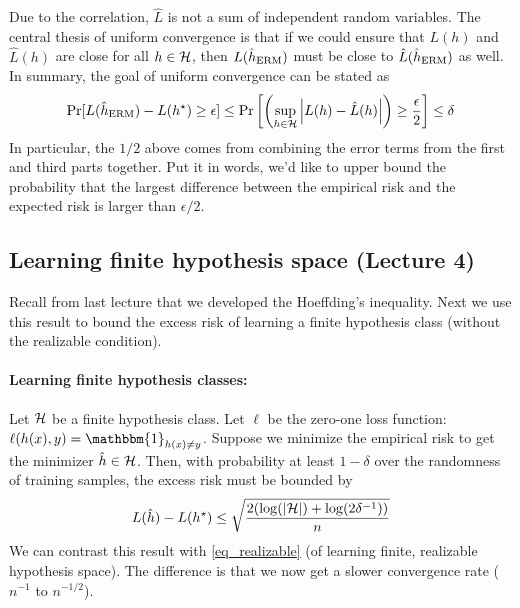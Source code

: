 Due to the correlation, $\hat L$ is not a sum of independent random variables.
The central thesis of uniform convergence is that if we could ensure that $L(h)$ and $\hat L(h)$ are close for all $h\in\mathcal{H}$, then $L(\hat h_{\textup{ERM}})$ must be close to $\hat L(\hat h_{\textup{ERM}})$ as well.
In summary, the goal of uniform convergence can be stated as
\begin{align}
    \Pr[L(\hat h_{\textup{ERM}}) - L(h^{\star}) \ge \epsilon]
    \le \Pr\left[ \left(\sup_{h \in \mathcal{H}} \left\lvert L(h) - \hat L(h)\right\rvert \right) \ge \frac {\epsilon} 2 \right]
    \le \delta
\end{align}
In particular, the $1/2$ above comes from combining the error terms from the first and third parts together.
Put it in words, we'd like to upper bound the probability that the largest difference between the empirical risk and the expected risk is larger than $\epsilon /2$.



\iffalse
\subsection{Learning finite hypothesis space (Lecture 4)}

Recall from last lecture that we developed the Hoeffding's inequality.
Next we use this result to bound the excess risk of learning a finite hypothesis class (without the realizable condition).

\paragraph{Learning finite hypothesis classes:}
Let $\mathcal{H}$ be a finite hypothesis class. Let $\ell$ be the zero-one loss function: $\ell(h(x), y) = \mathbbm{1}_{h(x) \neq y}$.
Suppose we minimize the empirical risk to get the minimizer $\hat h\in\mathcal{H}$.
Then, with probability at least $1 - \delta$ over the randomness of training samples, the excess risk must be bounded by
\begin{align} L(\hat h) - L(h^{\star}) \le \sqrt{\frac {2(\log(\left\lvert\mathcal{H}\right\rvert) + \log(2\delta^{-1}))} n } \label{eq_finite_real} \end{align}
We can contrast this result with \eqref{eq_realizable} (of learning finite, realizable hypothesis space).
The difference is that we now get a slower convergence rate ($n^{-1}$ to $n^{-1/2}$).

